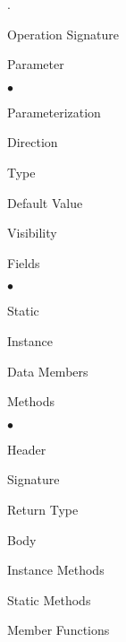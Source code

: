 \documentclass[11pt]{article}
\begin{document}
{\begin{list}{.}
\item Operation Signature

\item Parameter

    \begin{list}{$\bullet$}{\itemsep 0.01in \parskip 0in \parsep 0in}

        \item Parameterization

        \item Direction

        \item Type

        \item Default Value

    \end{list}

\item Visibility

\item Fields

    \begin{list}{$\bullet$}{\itemsep 0.01in \parskip 0in \parsep 0in}

        \item Static

        \item Instance

        \item Data Members

    \end{list}


\item Methods

    \begin{list}{$\bullet$}{\itemsep 0.01in \parskip 0in \parsep 0in}

        \item Header

        \item Signature

        \item Return Type

        \item Body

        \item Instance Methods

        \item Static Methods

        \item Member Functions


\end{list}
\end{list}}
\end{document}
